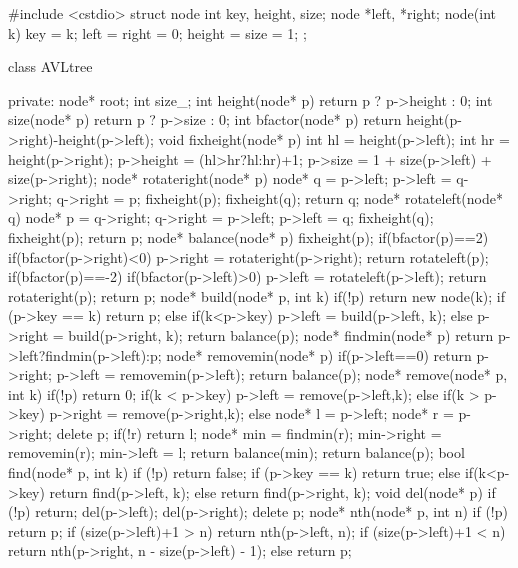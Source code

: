 \documentclass[11pt]{article}
\begin{document}
\begingroup\scriptsize
\begin{vncode}
#include <cstdio>
struct node {
    int key, height, size;
    node *left, *right;
    node(int k) {
        key = k; left = right = 0; 
        height = size = 1;
    }
};

class AVLtree {
private:
    node* root;
    int size_;
    int height(node* p) { return p ? p->height : 0; }
    int size(node* p) { return p ? p->size : 0; }
    int bfactor(node* p) {
        return height(p->right)-height(p->left);
    }
    void fixheight(node* p) {
        int hl = height(p->left);
        int hr = height(p->right);
        p->height = (hl>hr?hl:hr)+1;
        p->size = 1 + size(p->left) + size(p->right);
    }
    node* rotateright(node* p) {
        node* q = p->left;
        p->left = q->right;
        q->right = p;
        fixheight(p);
        fixheight(q);
        return q;
    }
    node* rotateleft(node* q) {
        node* p = q->right;
        q->right = p->left;
        p->left = q;
        fixheight(q);
        fixheight(p);
        return p;
    }
    node* balance(node* p) {
        fixheight(p);
        if(bfactor(p)==2) {
            if(bfactor(p->right)<0)
                p->right = rotateright(p->right);
            return rotateleft(p);
        }
        if(bfactor(p)==-2) {
            if(bfactor(p->left)>0)
                p->left = rotateleft(p->left);
            return rotateright(p);
        }
        return p;
    }
    node* build(node* p, int k) {
        if(!p) return new node(k);
        if (p->key == k) return p;
        else if(k<p->key) p->left = build(p->left, k);
        else p->right = build(p->right, k);
        return balance(p);
    }
    node* findmin(node* p) {
        return p->left?findmin(p->left):p;
    }
    node* removemin(node* p) {
        if(p->left==0) return p->right;
        p->left = removemin(p->left);
        return balance(p);
    }
    node* remove(node* p, int k) {
        if(!p) return 0;
        if(k < p->key) p->left = remove(p->left,k);
        else if(k > p->key) p->right = remove(p->right,k);  
        else {
            node* l = p->left;
            node* r = p->right;
            delete p;
            if(!r) return l;
            node* min = findmin(r);
            min->right = removemin(r);
            min->left = l;
            return balance(min);
        }
        return balance(p);
    }
    bool find(node* p, int k) {
        if (!p) return false;
        if (p->key == k) return true;
        else if(k<p->key) return find(p->left, k);
        else return find(p->right, k);
    }
    void del(node* p) {
        if (!p) return;
        del(p->left);
        del(p->right);
        delete p;
    }
    node* nth(node* p, int n) {
        if (!p) return p;
        if (size(p->left)+1 > n) return nth(p->left, n);
        if (size(p->left)+1 < n) return nth(p->right, n - size(p->left) - 1);
        else return p;
    }

}
\end{vncode}
\end{document}
